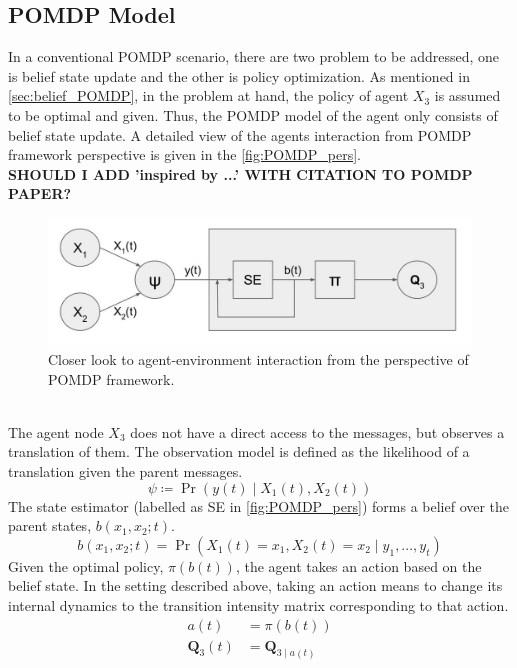 \subsection{POMDP Model}
In a conventional POMDP scenario, there are two problem to be addressed, one is belief state update and the other is policy optimization. As mentioned in \autoref{sec:belief_POMDP}, in the problem at hand, the policy of agent $ X_3 $ is assumed to be optimal and given. Thus, the POMDP model of the agent only consists of belief state update. A detailed view of the agents interaction from POMDP framework perspective is given in the \autoref{fig:POMDP_pers}. \\
\textbf{SHOULD I ADD 'inspired by ...' WITH CITATION TO POMDP PAPER?}\\
\begin{figure}[htb]
	\begin{center}
		\includegraphics[width=.75\textwidth]{figures/POMDP_pers}
		\caption{Closer look to agent-environment interaction from the perspective of POMDP framework.}
		\label{fig:POMDP_pers}
	\end{center}
\end{figure}\\
The agent node $ X_3 $ does not have a direct access to the messages, but observes a translation of them. The observation model is defined as the likelihood of a translation given the parent messages.
\begin{equation}
\psi \coloneqq \operatorname{Pr}(y(t) \mid X_{1}(t), X_{2}(t))
\end{equation}
The state estimator (labelled as SE in \autoref{fig:POMDP_pers}) forms a belief over the parent states, $  b(x_{1}, x_{2}; t) $. 
\begin{equation}
b(x_{1}, x_{2}; t) = \operatorname{Pr}( X_{1}(t) = x_{1},  X_{2}(t) = x_{2}\mid y_{1}, ..., y_{t})
\end{equation}
Given the optimal policy, $ \pi(b(t)) $, the agent takes an action based on the belief state. In the setting described above, taking an action means to change its internal dynamics to the transition intensity matrix corresponding to that action.
\begin{align}
a(t) &= \pi(b(t))\\
\textbf{Q}_3(t) & = \textbf{Q}_{3 \mid a(t)}
\end{align}

